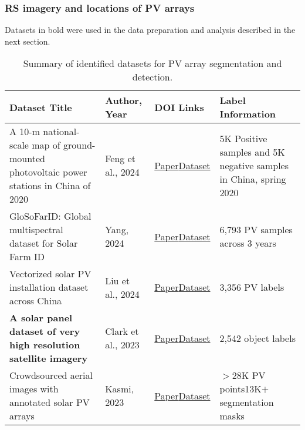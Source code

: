 \subsubsection{RS imagery and locations of PV arrays}
    Datasets in bold were used in the data preparation and analysis described in the next section. 
    \begin{table*}[htbp]
        \centering
        \scriptsize
        \caption{Summary of identified datasets for PV array segmentation and detection.}
        \begin{tabularx}{.95\textwidth}{|p{}|p{}|p{}|p{}|}  \hline
            \textbf{Dataset Title} & \textbf{Author, Year} & \textbf{DOI Links} & \textbf{Label Information} \\
                \hline
                A 10-m national-scale map of ground-mounted photovoltaic power stations in China of 2020 & Feng et al., 2024 & \href{https://doi.org/10.1038/s41597-024-02994-x}{Paper}\linebreak \href{https://doi.org/10.57760/sciencedb.o00121.00001}{Dataset} & 5K Positive samples and 5K negative samples in China, spring 2020 \\
                \hline
                GloSoFarID: Global multispectral dataset for Solar Farm ID & Yang, 2024 & \href{https://doi.org/10.48550/arXiv.2404.05180}{Paper}\linebreak \href{https://github.com/yzyly1992/GloSoFarID/tree/main/data_coordinates}{Dataset} & 6,793 PV samples across 3 years \\
                \hline
                Vectorized solar PV installation dataset across China & Liu et al., 2024 & \href{https://doi.org/10.1038/s41597-024-04356-z}{Paper}\linebreak \href{https://github.com/qingfengxitu/ChinaPV}{Dataset} & 3,356 PV labels \\
                \hline
                \textbf{A solar panel dataset of very high resolution satellite imagery} & Clark et al., 2023 & \href{https://doi.org/10.1038/s41597-023-02539-8}{Paper}\linebreak \href{https://doi.org/10.6084/m9.figshare.22081091.v3}{Dataset} & 2,542 object labels \\
                \hline
                Crowdsourced aerial images with annotated solar PV arrays & Kasmi, 2023 & \href{https://doi.org/10.1038/s41597-023-01951-4}{Paper}\linebreak \href{https://doi.org/10.5281/zenodo.6865878}{Dataset} & $>$28K PV points\linebreak 13K$+$ segmentation masks \\

\end{tabularx}
\end{table*}
